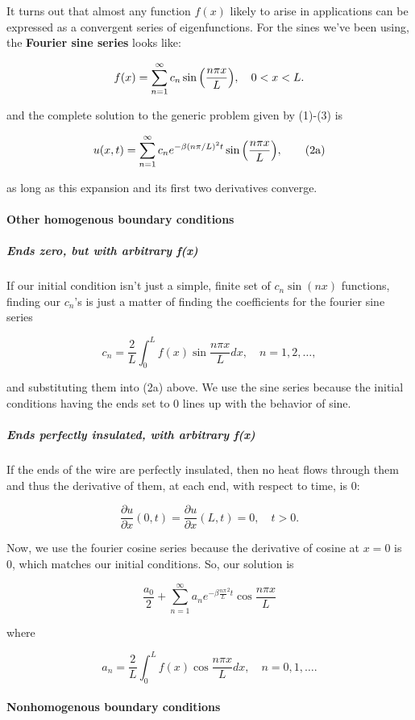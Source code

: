 \documentclass{article}
\begin{document}
It turns out that almost any function $f(x)$ likely to arise in applications can be expressed as a convergent series of eigenfunctions. For the sines we've been using, the \textbf{Fourier sine series} looks like:

\[ f(x) = \sum_{n=1}^{\infty} c_n \sin{\left(\frac{n \pi x}{L}\right)}, \quad 0 < x < L. \]

and the complete solution to the generic problem given by (1)-(3) is

\[ u(x,t) = \sum_{n=1}^{\infty} c_n e^{- \beta (n \pi/L)^2 t}\sin{\left(\frac{n \pi x}{L}\right)}, \tag{2a} \]

as long as this expansion and its first two derivatives converge.

\paragraph{Other homogenous boundary conditions}

\subparagraph{Ends zero, but with arbitrary f(x)}

If our initial condition isn't just a simple, finite set of $c_n\sin(nx)$ functions, finding our $c_n$'s is just a matter of finding the coefficients for the fourier sine series

\[ c_n = \frac{2}{L} \int_0^{L} f(x) \sin{\frac{n \pi x}{L}} dx, \quad n = 1,2, \dots , \]

and substituting them into (2a) above. We use the sine series because the initial conditions having the ends set to 0 lines up with the behavior of sine.

\subparagraph{Ends perfectly insulated, with arbitrary f(x)}

If the ends of the wire are perfectly insulated, then no heat flows through them and thus the derivative of them, at each end, with respect to time, is 0:

\[ \frac{\partial u}{\partial x}(0,t) = \frac{\partial u }{\partial x}(L, t) = 0, \quad t > 0. \]

Now, we use the fourier cosine series because the derivative of cosine at $x=0$ is 0, which matches our initial conditions. So, our solution is

\[ \frac{a_0}{2} + \sum_{n=1}^{\infty} a_n e^{-\beta\frac{n\pi}{L}^2t} \cos{\frac{n \pi x}{L}} \]

where

\[ a_n = \frac{2}{L} \int_0^{L} f(x) \cos{\frac{n \pi x}{L}} dx, \quad n = 0, 1, \dots . \]

\paragraph{Nonhomogenous boundary conditions}
\end{document}
